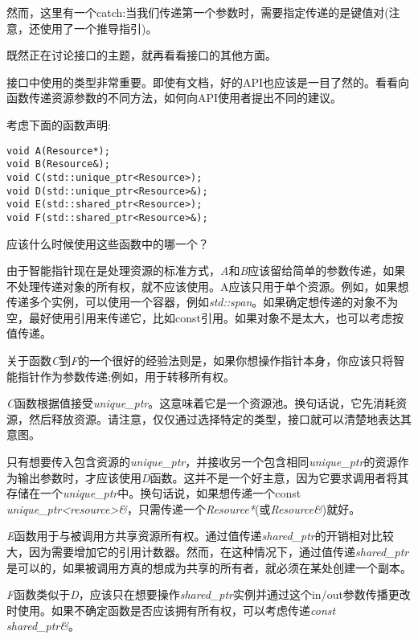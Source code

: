 然而，这里有一个catch:当我们传递第一个参数时，需要指定传递的是键值对(注意，还使用了一个推导指引)。

既然正在讨论接口的主题，就再看看接口的其他方面。


接口中使用的类型非常重要。即使有文档，好的API也应该是一目了然的。看看向函数传递资源参数的不同方法，如何向API使用者提出不同的建议。

考虑下面的函数声明:

\begin{lstlisting}[style=styleCXX]
void A(Resource*);
void B(Resource&);
void C(std::unique_ptr<Resource>);
void D(std::unique_ptr<Resource>&);
void E(std::shared_ptr<Resource>);
void F(std::shared_ptr<Resource>&);
\end{lstlisting}

应该什么时候使用这些函数中的哪一个？

由于智能指针现在是处理资源的标准方式，\textit{A}和\textit{B}应该留给简单的参数传递，如果不处理传递对象的所有权，就不应该使用。A应该只用于单个资源。例如，如果想传递多个实例，可以使用一个容器，例如\textit{std::span}。如果确定想传递的对象不为空，最好使用引用来传递它，比如const引用。如果对象不是太大，也可以考虑按值传递。

关于函数\textit{C}到\textit{F}的一个很好的经验法则是，如果你想操作指针本身，你应该只将智能指针作为参数传递;例如，用于转移所有权。

\textit{C}函数根据值接受\textit{unique\_ptr}。这意味着它是一个资源池。换句话说，它先消耗资源，然后释放资源。请注意，仅仅通过选择特定的类型，接口就可以清楚地表达其意图。

只有想要传入包含资源的\textit{unique\_ptr}，并接收另一个包含相同\textit{unique\_ptr}的资源作为输出参数时，才应该使用\textit{D}函数。这并不是一个好主意，因为它要求调用者将其存储在一个\textit{unique\_ptr}中。换句话说，如果想传递一个const \textit{unique\_ptr<resource>\&}，只需传递一个\textit{Resource*}(或\textit{Resource\&})就好。

\textit{E}函数用于与被调用方共享资源所有权。通过值传递\textit{shared\_ptr}的开销相对比较大，因为需要增加它的引用计数器。然而，在这种情况下，通过值传递\textit{shared\_ptr}是可以的，如果被调用方真的想成为共享的所有者，就必须在某处创建一个副本。

\textit{F}函数类似于\textit{D}，应该只在想要操作\textit{shared\_ptr}实例并通过这个in/out参数传播更改时使用。如果不确定函数是否应该拥有所有权，可以考虑传递\textit{const shared\_ptr\&}。

